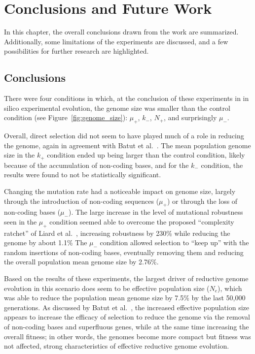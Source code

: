 
\chapter{Conclusions and Future Work}\label{ch:05conclusion}

In this chapter, the overall conclusions drawn from the work are summarized. Additionally, some limitations of the experiments are discussed, and a few possibilities for further research are highlighted.

\section{Conclusions}
There were four conditions in which, at the conclusion of these experiments in in silico experimental evolution, the genome size was smaller than the control condition (see Figure~\ref{fig:genome_size}): $\mu_+$, $k_-$, $N_+$, and surprisingly $\mu_-$. 

Overall, direct selection did not seem to have played much of a role in reducing the genome, again in agreement with Batut et al.~\cite{Batut.2014}. The mean population genome size in the $k_+$ condition ended up being larger than the control condition, likely because of the accumulation of non-coding bases, and for the $k_-$ condition, the results were found to not be statistically significant. 

Changing the mutation rate had a noticeable impact on genome size, largely through the introduction of non-coding sequences ($\mu_+$) or through the loss of non-coding bases ($\mu_-$). The large increase in the level of mutational robustness seen in the $\mu_+$ condition seemed able to overcome the proposed ``complexity ratchet'' of Liard et al.~\cite{Liard.2018}, increasing robustness by 230\% while reducing the genome by about 1.1\% The $\mu_-$ condition allowed selection to ``keep up'' with the random insertions of non-coding bases, eventually removing them and reducing the overall population mean genome size by 2.76\%. 

Based on the results of these experiments, the largest driver of reductive genome evolution in this scenario does seem to be effective population size ($N_e$), which was able to reduce the population mean genome size by 7.5\% by the last 50,000 generations. As discussed by Batut et al.~\cite{Batut.2014}, the increased effective population size appears to increase the efficacy of selection to reduce the genome via the removal of non-coding bases and superfluous genes, while at the same time increasing the overall fitness; in other words, the genomes become more compact but fitness was not affected, strong characteristics of effective reductive genome evolution. 


